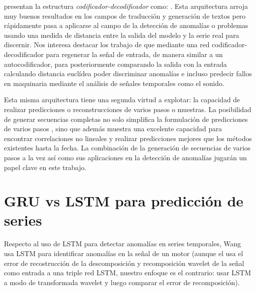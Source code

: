 \citeauthor{Cho2014} presentan la estructura \textit{codificador-decodificador} como: . Esta arquitectura arroja muy buenos resultados en los campos de traducción y generación de textos \cite{Cho2014,cho2014b,Serban2017,Tran2017} pero rápidamente pasa a aplicarse al campo de la detección de anomalías o problemas usando una medida de distancia entre la salida del modelo y la serie real para discernir\cite{Wang2018,malhotra2016,Park2018,Wang2020}. Nos interesa destacar los trabajo de  que mediante una red codificador-decodificador para regenerar la señal de entrada, de manera similar a un autocodificador, para posteriormente comparando la salida con la entrada calculando distancia euclídea poder discriminar anomalías e incluso predecir fallos en maquinaria mediante el análisis de señales temporales como el sonido.

  Esta misma arquitectura tiene una segunda virtud a explotar: la capacidad de realizar predicciones o reconstrucciones de varios pasos o muestras\cite{Peng2018}. La posibilidad de generar secuencias completas no solo simplifica la formulación de predicciones de varios pasos \cite{Kao2020}, sino que además muestra una excelente capacidad para encontrar correlaciones no lineales y realizar predicciones mejores que los métodos existentes hasta la fecha\cite{Peng2018,Du2019,Kao2020}. La combinación de la generación de secuencias de varios pasos a la vez así como sus aplicaciones en la detección de anomalías jugarán un papel clave en este trabajo.



\iffalse


\section{GRU vs LSTM para predicción de series}\label{sa_rnn}

Respecto al uso de LSTM para detectar anomalías en series temporales, Wang \cite{Wang2020}  usa LSTM para identificar anomalías en la señal de un motor (aunque el usa el error de recostrucción de la descomposición y recomposición wavelet de la señal como entrada a una triple red LSTM, nuestro enfoque es el contrario: usar LSTM a modo de transformada wavelet y luego comparar el error de recomposición).

